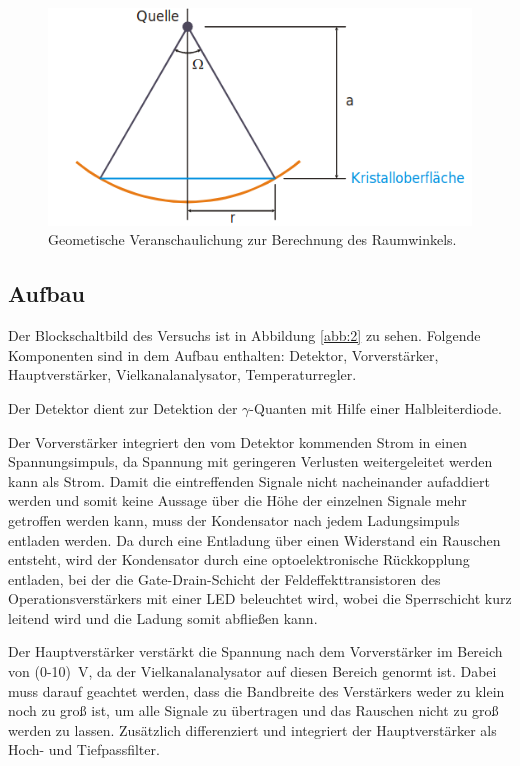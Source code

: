 \begin{figure}
  \centering
  \includegraphics[scale=0.7]{Raumwinkel.png}
  \caption{Geometische Veranschaulichung zur Berechnung des Raumwinkels. \cite{Q1}}
  \label{abb:Raumwinkel}
\end{figure}

\subsection{Aufbau}

Der Blockschaltbild des Versuchs ist in Abbildung \ref{abb:2} zu sehen. Folgende
Komponenten sind in dem Aufbau enthalten: Detektor, Vorverstärker, Hauptverstärker,
Vielkanalanalysator, Temperaturregler.

Der Detektor dient zur Detektion der $\gamma$-Quanten mit Hilfe
einer Halbleiterdiode.

Der Vorverstärker integriert den vom Detektor
kommenden Strom in einen Spannungsimpuls, da Spannung mit geringeren
Verlusten weitergeleitet werden kann als Strom. Damit die eintreffenden Signale
nicht nacheinander aufaddiert werden und somit keine Aussage über die Höhe der
einzelnen Signale mehr getroffen werden kann, muss der Kondensator nach jedem
Ladungsimpuls entladen werden. Da durch eine
Entladung über einen Widerstand ein Rauschen entsteht, wird der Kondensator
durch eine optoelektronische Rückkopplung entladen, bei der die
Gate-Drain-Schicht der Feldeffekttransistoren
des Operationsverstärkers mit einer LED beleuchtet wird, wobei die
Sperrschicht kurz leitend wird und die Ladung somit abfließen kann.

Der Hauptverstärker verstärkt die Spannung
nach dem Vorverstärker im Bereich von \SI{(0-10)}{\volt}, da der
Vielkanalanalysator auf diesen Bereich genormt ist. Dabei muss darauf
geachtet werden, dass die Bandbreite
des Verstärkers weder zu klein noch zu groß ist, um alle Signale zu
übertragen und das Rauschen nicht zu groß werden zu lassen.
Zusätzlich differenziert und integriert der Hauptverstärker als Hoch- und
Tiefpassfilter.

